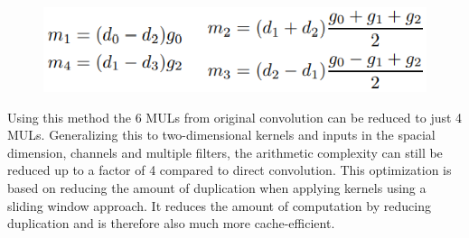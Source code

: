 \begin{figure}[ht]
	\begin{center}
		\includegraphics[width=0.8\linewidth]{images/winograd2.PNG}
	\end{center}
	\label{fig:winograd2}
\end{figure}

Using this method the 6 MULs from original convolution can be reduced to just 4 MULs. Generalizing this to two-dimensional kernels and inputs in the spacial dimension, channels and multiple filters, the arithmetic complexity can still be reduced up to a factor of 4 compared to direct convolution. This optimization is based on reducing the amount of duplication when applying kernels using a sliding window approach. It reduces the amount of computation by reducing duplication and is therefore also much more cache-efficient. \cite{AndrewLavin.2015}